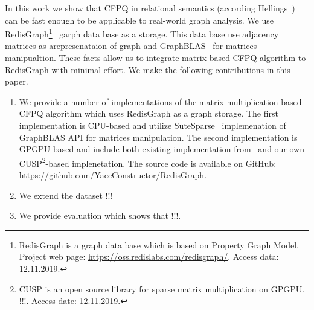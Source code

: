 

In this work we show that CFPQ in relational semantics (according Hellings~\cite{hellingsRelational}) can be fast enough to be applicable to real-world graph analysis.
We use RedisGraph\footnote{RedisGraph is a graph data base which is based on Property Graph Model. Project web page: \url{https://oss.redislabs.com/redisgraph/}. Access data: 12.11.2019.}~\cite{8778293} garph data base as a storage.
This data base use adjacency matrices as arepresenataion of graph and GraphBLAS~\cite{7761646} for matrices manipualtion.
These facts allow us to integrate matrix-based CFPQ algorithm to RedisGraph with minimal effort.
We make the following contributions in this paper.
\begin{enumerate}
\item We provide a number of implementations of the matrix multiplication based CFPQ algorithm which uses RedisGraph as a graph storage.
The first implementation is CPU-based and utilize SuteSparse~\cite{!!!} implemenation of GraphBLAS API for matrices manipulation.
The second implementation is GPGPU-based and include both existing implementation from~\cite{!!!} and our own CUSP\footnote{CUSP is an open source library for sparse matrix multiplication on GPGPU. \url{!!!}. Access date: 12.11.2019.}-based implenetation.
The source code is available on GitHub: \url{https://github.com/YaccConstructor/RedisGraph}.
\item We extend the dataset !!!
\item We provide evaluation which shows that !!!.
\end{enumerate}
